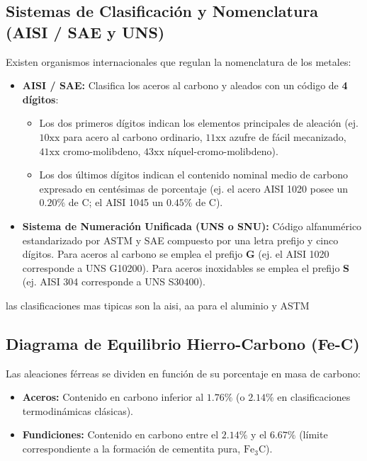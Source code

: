 \subsection{Sistemas de Clasificación y Nomenclatura (AISI / SAE y UNS)}
Existen organismos internacionales que regulan la nomenclatura de los metales:
\begin{itemize}
    \item \textbf{AISI / SAE:} Clasifica los aceros al carbono y aleados con un código de \textbf{4 dígitos}:
          \begin{itemize}
              \item Los dos primeros dígitos indican los elementos principales de aleación (ej. $10\text{xx}$ para acero al carbono ordinario, $11\text{xx}$ azufre de fácil mecanizado, $41\text{xx}$ cromo-molibdeno, $43\text{xx}$ níquel-cromo-molibdeno).
              \item Los dos últimos dígitos indican el contenido nominal medio de carbono expresado en centésimas de porcentaje (ej. el acero AISI 1020 posee un $0.20\%$ de C; el AISI 1045 un $0.45\%$ de C).
          \end{itemize}
    \item \textbf{Sistema de Numeración Unificada (UNS o SNU):} Código alfanumérico estandarizado por ASTM y SAE compuesto por una letra prefijo y cinco dígitos. Para aceros al carbono se emplea el prefijo \textbf{G} (ej. el AISI 1020 corresponde a UNS G10200). Para aceros inoxidables se emplea el prefijo \textbf{S} (ej. AISI 304 corresponde a UNS S30400).
\end{itemize}
las clasificaciones mas tipicas son la aisi, aa para el aluminio y ASTM
\subsection{Diagrama de Equilibrio Hierro-Carbono (Fe-C)}
Las aleaciones férreas se dividen en función de su porcentaje en masa de carbono:
\begin{itemize}
    \item \textbf{Aceros:} Contenido en carbono inferior al $1.76\%$ (o $2.14\%$ en clasificaciones termodinámicas clásicas).
    \item \textbf{Fundiciones:} Contenido en carbono entre el $2.14\%$ y el $6.67\%$ (límite correspondiente a la formación de cementita pura, $\text{Fe}_3\text{C}$).
\end{itemize}
